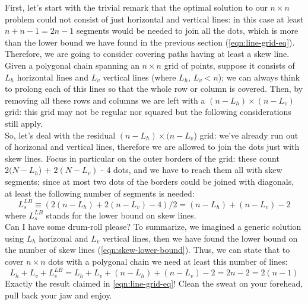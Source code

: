 \documentclass[11pt]{article}
\begin{document}
First, let's start with the trivial remark that the optimal solution to our $n \times n$ problem could not consist of just horizontal and vertical lines: in this case at least $n + n - 1 = 2n - 1$ segments would be needed to join all the dots, which is more than the lower bound we have found in the previous section (\autoref{eqn:line-grid-eq}). Therefore, we are going to consider covering paths having at least a skew line.\\
Given a polygonal chain spanning an $n\times n$ grid of points, suppose it consists of $L_{h}$ horizontal lines and $L_{v}$ vertical lines (where $L_{h}$, $L_{v} < n$); we can always think to prolong each of this lines so that the whole row or column is covered. Then, by removing all these rows and columns we are left with a $(n - L_{h}) \times (n - L_{v})$ grid: this grid may not be regular nor squared but the following considerations still apply.\\
So, let's deal with the residual $(n - L_{h}) \times (n - L_{v}$) grid: we've already run out of horizonal and vertical lines, therefore we are allowed to join the dots just with skew lines. Focus in particular on the outer borders of the grid: these count $2(N-L_{h}$) + $2(N - L_{v})$ - 4 dots, and we have to reach them all with skew segments; since at most two dots of the borders could be joined with diagonals, at least the following number of segments is needed:
\begin{equation}
L_{s}^{LB} \equiv (2(n-L_{h}) + 2(n - L_{v}) - 4) / 2 = (n- L_{h}) + (n - L_{v}) - 2
\label{eqn:skew-lower-bound}
\end{equation}
where $L_{s}^{LB}$ stands for the lower bound on skew lines.\\
Can I have some drum-roll please? To summarize, we imagined a generic solution using $L_{h}$ horizonal and $L_{v}$ vertical lines, then we have found the lower bound on the number of skew lines (\autoref{eqn:skew-lower-bound}). Thus, we can state that to cover $n\times n$ dots with a polygonal chain we need at least this number of lines:
\begin{equation}
L_{h} + L_{v} + L_{s}^{LB} = L_{h} + L_{v} + (n - L_{h}) + (n - L_{v}) - 2 = 2n - 2 = 2(n-1)
\label{eqn:lower-bound-grid}
\end{equation}
Exactly the result claimed in \autoref{eqn:line-grid-eq}! Clean the sweat on your forehead, pull back your jaw and enjoy. 
\end{document}
